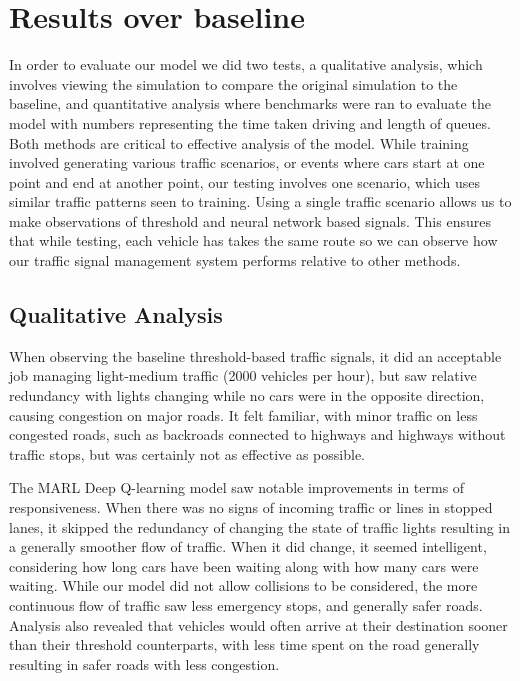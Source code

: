 \documentclass[conference]{IEEEtran}
\begin{document}
\section{Results over baseline}

In order to evaluate our model we did two tests, a qualitative analysis, which involves viewing the simulation to compare the original simulation to the baseline, and quantitative analysis where benchmarks were ran to evaluate the model with numbers representing the time taken driving and length of queues. Both methods are critical to effective analysis of the model. While training involved generating various traffic scenarios, or events where cars start at one point and end at another point, our testing involves one scenario, which uses similar traffic patterns seen to training. Using a single traffic scenario allows us to make observations of threshold and neural network based signals. This ensures that while testing, each vehicle has takes the same route so we can observe how our traffic signal management system performs relative to other methods. 

\subsection{Qualitative Analysis}

When observing the baseline threshold-based traffic signals, it did an acceptable job managing light-medium traffic (2000 vehicles per hour), but saw relative redundancy with lights changing while no cars were in the opposite direction, causing congestion on major roads. It felt familiar, with minor traffic on less congested roads, such as backroads connected to highways and highways without traffic stops, but was certainly not as effective as possible. 

The MARL Deep Q-learning model saw notable improvements in terms of responsiveness. When there was no signs of incoming traffic or lines in stopped lanes, it skipped the redundancy of changing the state of traffic lights resulting in a generally smoother flow of traffic. When it did change, it seemed intelligent, considering how long cars have been waiting along with how many cars were waiting. While our model did not allow collisions to be considered, the more continuous flow of traffic saw less emergency stops, and generally safer roads. Analysis also revealed that vehicles would often arrive at their destination sooner than their threshold counterparts, with less time spent on the road generally resulting in safer roads with less congestion.  
\end{document}
